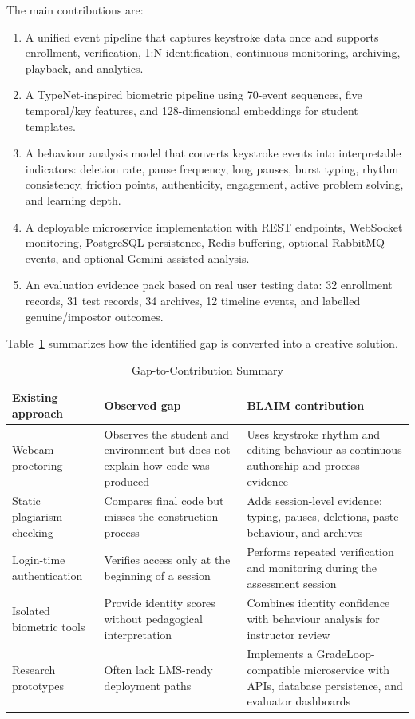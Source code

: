 The main contributions are:

\begin{enumerate}
  \item A unified event pipeline that captures keystroke data once and supports enrollment, verification, 1:N identification, continuous monitoring, archiving, playback, and analytics.
  \item A TypeNet-inspired biometric pipeline using 70-event sequences, five temporal/key features, and 128-dimensional embeddings for student templates.
  \item A behaviour analysis model that converts keystroke events into interpretable indicators: deletion rate, pause frequency, long pauses, burst typing, rhythm consistency, friction points, authenticity, engagement, active problem solving, and learning depth.
  \item A deployable microservice implementation with REST endpoints, WebSocket monitoring, PostgreSQL persistence, Redis buffering, optional RabbitMQ events, and optional Gemini-assisted analysis.
  \item An evaluation evidence pack based on real user testing data: 32 enrollment records, 31 test records, 34 archives, 12 timeline events, and labelled genuine/impostor outcomes.
\end{enumerate}

Table~\ref{tab:novelty-gap} summarizes how the identified gap is converted into a creative solution.

\begin{table}[H]
  \centering
  \caption{Gap-to-Contribution Summary}
  \label{tab:novelty-gap}
  \begin{singlespace}
  \begin{tabularx}{\textwidth}{@{}p{3.6cm}p{4.6cm}p{5.0cm}@{}}
    \toprule
    \textbf{Existing approach} & \textbf{Observed gap} & \textbf{BLAIM contribution} \\
    \midrule
    Webcam proctoring & Observes the student and environment but does not explain how code was produced & Uses keystroke rhythm and editing behaviour as continuous authorship and process evidence \\
    Static plagiarism checking & Compares final code but misses the construction process & Adds session-level evidence: typing, pauses, deletions, paste behaviour, and archives \\
    Login-time authentication & Verifies access only at the beginning of a session & Performs repeated verification and monitoring during the assessment session \\
    Isolated biometric tools & Provide identity scores without pedagogical interpretation & Combines identity confidence with behaviour analysis for instructor review \\
    Research prototypes & Often lack LMS-ready deployment paths & Implements a GradeLoop-compatible microservice with APIs, database persistence, and evaluator dashboards \\
    \bottomrule
  \end{tabularx}
  \end{singlespace}
\end{table}

